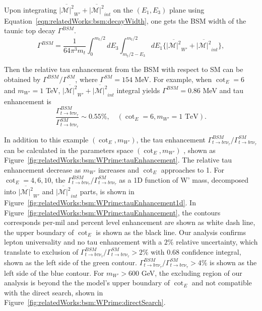 Upon integrating  $\overline{ |\mathcal{M}|^2 } _{W'} +  \overline{ |\mathcal{M}|^2 } _{int}$ on the $(E_1,E_3)$ plane using Equation~\ref{eqn:relatedWorks:bsm:decayWidth}, one gets the BSM width of the taunic top decay $\Gamma^{BSM}$. 
\begin{equation}
	\Gamma^{BSM} = \frac{1}{64 \pi^3 m_t} \int_{0}^{m_t/2} dE_3 \int_{m_t/2-E_3}^{m_t/2} dE_1  \bigg\{ \overline{ |\mathcal{M}|^2 } _{W'} +  \overline{ |\mathcal{M}|^2}_{int}  \bigg \},
\end{equation}


\noindent Then the relative tau enhancement from the BSM with respect to SM can be obtained by $\Gamma^{BSM}/ \Gamma^{SM}$, where $\Gamma^{SM}=154$ MeV. For example, when $\cot_E=6$  and $m_{W'}=1$ TeV, $\overline{ |\mathcal{M}|^2 } _{W'} +  \overline{ |\mathcal{M}|^2 } _{int}$ integral yields $\Gamma^{BSM} = 0.86 $ MeV and tau enhancement is
\begin{equation}
	\frac{ \Gamma_{t\to b \tau \nu_\tau}^{BSM} }{ \Gamma_{t\to b \tau \nu_\tau}^{SM} } \sim 0.55 \%, \quad (\cot_E=6, m_{W'}=1 \text{ TeV}).
\end{equation}

\noindent In addition to this example $(\cot_E, m_{W'})$, the tau enhancement $ \Gamma_{t\to b \tau \nu_\tau}^{BSM} / \Gamma_{t\to b \tau \nu_\tau}^{SM} $ can be calculated in the  parameters space $(\cot_E, m_{W'})$ , shown as Figure~\ref{fig:relatedWorks:bsm:WPrime:tauEnhancement}. The relative tau enhancement decrease as $m_{W'}$ increases and $\cot_E$ approaches to 1. For $\cot_E=4,6,10$, the $\Gamma_{t\to b \tau \nu_\tau}^{BSM}/  \Gamma_{t\to b \tau \nu_\tau}^{SM} $ as a 1D function of W' mass, decomposed into $\overline{ |\mathcal{M}|^2 } _{W'} $ and $\overline{ |\mathcal{M}|^2 } _{int}$  parts, is shown in Figure~\ref{fig:relatedWorks:bsm:WPrime:tauEnhancement1d}. In Figure~\ref{fig:relatedWorks:bsm:WPrime:tauEnhancement}, the contours corresponds per-mil and percent level enhancement are shown as white dash line, the upper boundary of $\cot_E$ is shown as the black line. Our analysis confirms lepton universality and no tau enhancement with a $2\%$ relative uncertainty, which translate to exclusion of $ \Gamma_{t\to b \tau \nu_\tau}^{BSM} / \Gamma_{t\to b \tau \nu_\tau}^{SM} >  2\%$ with 0.68 confidence integral, shown as the left side of the green contour. $ \Gamma_{t\to b \tau \nu_\tau}^{BSM} / \Gamma_{t\to b \tau \nu_\tau}^{SM} >  4\%$ is shown as the left side of the blue contour. For $m_{W'}>600$ GeV, the excluding region of our analysis is beyond the the model's upper boundary of $\cot_E$ and not compatible with the direct search, shown in Figure~\ref{fig:relatedWorks:bsm:WPrime:directSearch}.




